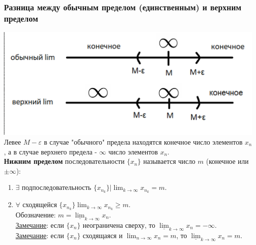 \documentclass[12pt]{article}
\let\ORIincludegraphics\includegraphics
\renewcommand{\includegraphics}[2][]{\ORIincludegraphics[scale=0.65,#1]{#2}}
\begin{document}
    \subsubsection*{Разница между обычным пределом (единственным) и верхним пределом}
    \includegraphics[width=\linewidth,keepaspectratio]{2.9.1}\\
    Левее $M-\varepsilon$ в случае "обычного" предела находятся конечное число элементов $x_n$, а в случае верхнего предела - $\infty$ число элементов $x_n$.\\
    \textbf{Нижним пределом} последовательности $\{x_n\}$ называется число $m$ (конечное или $\pm \infty$):
    \begin{enumerate}
        \item $\exists$ подпоследовательность $\{x_{n_{k}}\} \Big| \lim_{k\to\infty}x_{n_{k}} = m$.
        \item $\forall$ сходящейся $\{x_{n_{k}}\} \lim_{k\to\infty} x_{n_{k}} \ge m$.\\
        Обозначение: $m = \underline{\lim}_{k\to\infty}x_n$.\\
        \underline{Замечание}: если $\{x_n\}$ неограничена сверху, то $\underline{\lim}_{k\to\infty}x_n = -\infty$.\\
        \underline{Замечание}: если $\{x_n\}$ сходящаяся и $\lim_{n\to\infty} x_n = m$, то $\underline{\lim}_{k\to\infty}x_n = m$.
    \end{enumerate}
\end{document}
